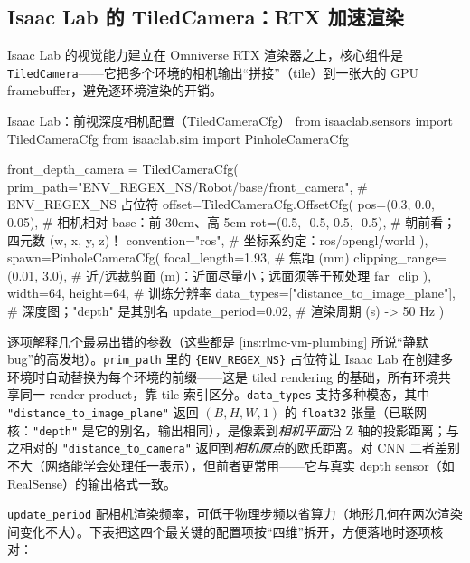 \subsection{Isaac Lab 的 TiledCamera：RTX 加速渲染}
\label{sec:rlmc-vm-tiledcam}

Isaac Lab 的视觉能力建立在 Omniverse RTX 渲染器之上，核心组件是 \verb|TiledCamera|——它把多个环境的相机输出“拼接”（tile）到一张大的 GPU framebuffer，避免逐环境渲染的开销。

\begin{codebox}[Python]{Isaac Lab：前视深度相机配置（TiledCameraCfg）}
from isaaclab.sensors import TiledCameraCfg
from isaaclab.sim import PinholeCameraCfg

front_depth_camera = TiledCameraCfg(
    prim_path="{ENV_REGEX_NS}/Robot/base/front_camera",  # ENV_REGEX_NS 占位符
    offset=TiledCameraCfg.OffsetCfg(
        pos=(0.3, 0.0, 0.05),         # 相机相对 base：前 30cm、高 5cm
        rot=(0.5, -0.5, 0.5, -0.5),   # 朝前看；四元数 (w, x, y, z)！
        convention="ros",              # 坐标系约定：ros/opengl/world
    ),
    spawn=PinholeCameraCfg(
        focal_length=1.93,             # 焦距 (mm)
        clipping_range=(0.01, 3.0),   # 近/远裁剪面 (m)：近面尽量小；远面须等于预处理 far_clip
    ),
    width=64, height=64,               # 训练分辨率
    data_types=["distance_to_image_plane"],  # 深度图；"depth" 是其别名
    update_period=0.02,                # 渲染周期 (s) -> 50 Hz
)
\end{codebox}

逐项解释几个最易出错的参数（这些都是 \cref{ins:rlmc-vm-plumbing} 所说“静默 bug”的高发地）。\verb|prim_path| 里的 \verb|{ENV_REGEX_NS}| 占位符让 Isaac Lab 在创建多环境时自动替换为每个环境的前缀——这是 tiled rendering 的基础，所有环境共享同一 render product，靠 tile 索引区分。\verb|data_types| 支持多种模态，其中 \verb|"distance_to_image_plane"| 返回 $(B,H,W,1)$ 的 \verb|float32| 张量（已联网核：\verb|"depth"| 是它的别名，输出相同），是像素到\emph{相机平面}沿 Z 轴的投影距离；与之相对的 \verb|"distance_to_camera"| 返回到\emph{相机原点}的欧氏距离。对 CNN 二者差别不大（网络能学会处理任一表示），但前者更常用——它与真实 depth sensor（如 RealSense）的输出格式一致。

\verb|update_period| 配相机渲染频率，可低于物理步频以省算力（地形几何在两次渲染间变化不大）。下表把这四个最关键的配置项按“四维”拆开，方便落地时逐项核对：

